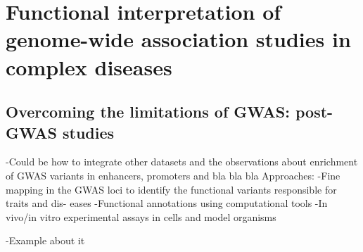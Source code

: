 \section{Functional interpretation of genome-wide association studies in complex diseases}
\subsection{Overcoming the limitations of GWAS: post-GWAS studies}
-Could be how to integrate other datasets and the observations about enrichment of GWAS variants in enhancers, promoters and bla bla bla
Approaches:
	-Fine mapping in the GWAS loci to identify the functional variants responsible for traits and dis-
 eases
	-Functional annotations using computational tools
	-In vivo/in vitro experimental assays in cells and model organisms
	
	-Example about it
	

